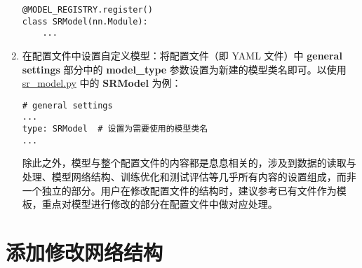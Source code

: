 \documentclass[../main.tex]{subfiles}
\begin{document}
\begin{enumerate}[第 1 步]
\begin{verbatim}
@MODEL_REGISTRY.register()
class SRModel(nn.Module):
    ...
\end{verbatim}

    \item 在配置文件中设置自定义模型：将配置文件（即 YAML 文件）中 \textbf{general settings} 部分中的 \textbf{model\_type} 参数设置为新建的模型类名即可。以使用 \href{https://github.com/XPixelGroup/BasicSR/tree/master/basicsr/models/sr_model.py}{sr\_model.py} 中的 \textbf{SRModel} 为例：

\begin{verbatim}
# general settings
...
type: SRModel  # 设置为需要使用的模型类名
...
\end{verbatim}
            除此之外，模型与整个配置文件的内容都是息息相关的，涉及到数据的读取与处理、模型网络结构、训练优化和测试评估等几乎所有内容的设置组成，而非一个独立的部分。用户在修改配置文件的结构时，建议参考已有文件作为模板，重点对模型进行修改的部分在配置文件中做对应处理。

\end{enumerate}

\section{添加修改网络结构}\label{howto:add_arch}
\end{document}
